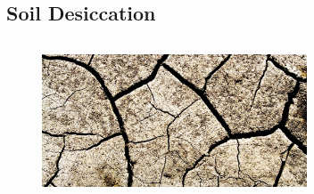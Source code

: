 \subsection{Soil Desiccation}
\subsectioncover

\begin{frame}
  \vspace{-1.5em}
  \begin{columns}[T]
    \begin{column}{0.5\textwidth}
      \begin{figure}
        \centering
        \includegraphics[width=0.7\textwidth]{Chapter1/figures/desiccation}
      \end{figure}
      

\end{column}
\end{columns}
\end{frame}
